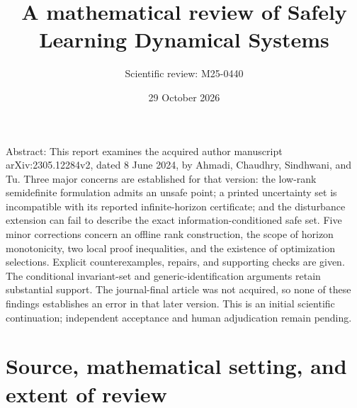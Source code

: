 \documentclass[10pt]{article}
\title{A mathematical review of
Safely Learning Dynamical Systems}
\author{Scientific review: M25-0440}
\date{29 October 2026}
\begin{document}
\maketitle
Abstract: This report examines the acquired author manuscript arXiv:2305.12284v2, dated 8 June 2024, by Ahmadi, Chaudhry, Sindhwani, and Tu. Three major concerns are established for that version: the low-rank semidefinite formulation admits an unsafe point; a printed uncertainty set is incompatible with its reported infinite-horizon certificate; and the disturbance extension can fail to describe the exact information-conditioned safe set. Five minor corrections concern an offline rank construction, the scope of horizon monotonicity, two local proof inequalities, and the existence of optimization selections. Explicit counterexamples, repairs, and supporting checks are given. The conditional invariant-set and generic-identification arguments retain substantial support. The journal-final article was not acquired, so none of these findings establishes an error in that later version. This is an initial scientific continuation; independent acceptance and human adjudication remain pending.\par
\section*{Source, mathematical setting, and extent of review}
\end{document}
